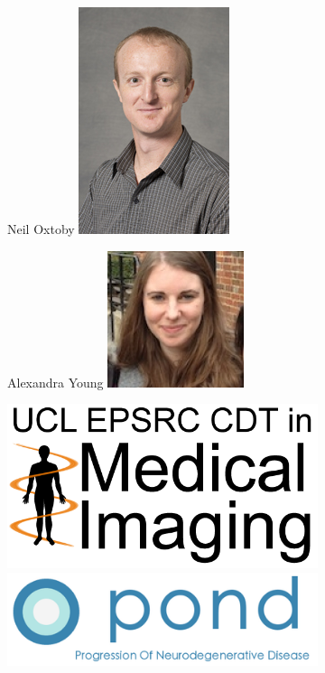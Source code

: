 \documentclass[10pt,xcolor=table]{beamer}
\begin{document}
\begin{frame}
\begin{figure}
  \begin{subfigure}{0.25\textwidth}
 \centering
 Neil Oxtoby
 \includegraphics[scale=0.35]{neil_photo.jpg}  
 \end{subfigure}
  \begin{subfigure}{0.25\textwidth}
 \centering
 Alexandra Young
 \includegraphics[scale=0.5]{alex_photo.jpg}  
 \end{subfigure}
  \begin{subfigure}{0.3\textwidth}
  \centering
  \includegraphics[scale=0.15]{CDTlogo.png}\\
  \vspace{1em}
  \includegraphics[scale=1]{pondLogo.png}  
  \end{subfigure}

\end{figure}


\end{frame}

 
\end{document}
